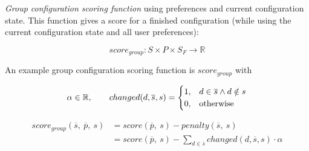 \documentclass{article}
\begin{document}

\emph{Group configuration scoring function} using preferences and current configuration state. This function gives a score for a finished configuration (while using the current configuration state and all user preferences):

\begin{equation}
    score_{group}: S \times P \times S_F \to \mathbb{R}
\end{equation}

An example group configuration scoring function is $score_{group}$ with

\begin{equation}
    \notag \alpha \in \mathbb{R}, \qquad     changed(d,\overline{s}, s) = 
    \begin{cases}
      1, & d \in \overline{s} \land d \notin s \\
      0, & \text{otherwise}
    \end{cases}
\end{equation}

\begin{equation}
    \begin{split}
        score_{group}(\overline{s},\ \overline{p},\ s)
        & = score(\overline{p},\ s) - penalty(\overline{s},\ s) \\
        & = score(\overline{p},\ s) - \sum_{d \in \overline{s}} changed(d,\overline{s}, s) \cdot \alpha
    \end{split}
\end{equation}
\end{document}
